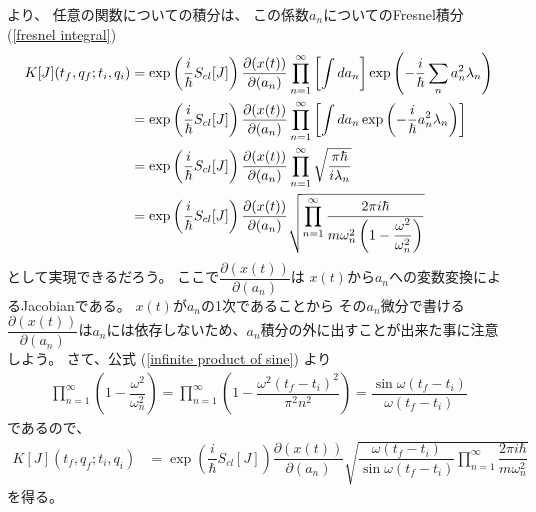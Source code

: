 より、
任意の関数についての積分は、
この係数$a_n$についてのFresnel積分
(\ref{fresnel integral})
\begin{align}
    K[J]( t_f, q_f ; t_i, q_i )
    &=
    \exp\left(
        \dfrac{i}{\hbar} S_{cl} [J]
    \right)
        \dfrac{ \partial ( x(t) ) }
            { \partial (a_n) }
    \prod_{n=1}^\infty
    \left[
        \int d a_n
    \right]
    \exp\left(
        -
        \dfrac{ i }{\hbar}
        \sum_{n}
        a_n^2
        \lambda_n
    \right)
\notag\\&=
    \exp\left(
        \dfrac{i}{\hbar} S_{cl} [J]
    \right)
        \dfrac{ \partial ( x(t) ) }
            { \partial (a_n) }
    \prod_{n=1}^\infty
    \left[
        \int d a_n
        \exp\left(
            -
            \dfrac{ i }{\hbar}
            a_n^2
            \lambda_n
        \right)
    \right]
\notag\\&=
    \exp\left(
        \dfrac{i}{\hbar} S_{cl} [J]
    \right)
        \dfrac{ \partial ( x(t) ) }
            { \partial (a_n) }
    \prod_{n=1}^\infty
    \sqrt{
        \dfrac{\pi \hbar}{i \lambda_n}
    }
\notag\\&=
    \exp\left(
        \dfrac{i}{\hbar} S_{cl} [J]
    \right)
        \dfrac{ \partial ( x(t) ) }
            { \partial (a_n) }
    \sqrt{
        \prod_{n=1}^\infty
        \dfrac{2 \pi i \hbar}{
            m \omega_n^2 \left(
                1 - \dfrac{ \omega^2 }{ \omega_n^2 }
            \right)
        }
    }
\end{align}
として実現できるだろう。
ここで$\dfrac{ \partial ( x(t) ) }{ \partial (a_n) }$は
$x(t)$から$a_n$への変数変換によるJacobianである。
$x(t)$が$a_n$の1次であることから
その$a_n$微分で書ける
$\dfrac{ \partial ( x(t) ) }{ \partial (a_n) }$は$a_n$には依存しないため、$a_n$積分の外に出すことが出来た事に注意しよう。
さて、公式
(\ref{infinite product of sine})
より
\begin{align}
    \prod_{n=1}^\infty
    \left(
        1 - \dfrac{ \omega^2 }{ \omega_n^2 }
    \right)
    =
    \prod_{n=1}^\infty
    \left(
        1
        -
        \dfrac{
            \omega^2 (t_f - t_i)^2
        }{ \pi^2 n^2 }
    \right)
    =
    \dfrac{
        \sin \omega (t_f - t_i)
    }{ \omega (t_f - t_i) }
\end{align}
であるので、
\begin{align}
    K[J]( t_f, q_f ; t_i, q_i )
    &=
    \exp\left(
        \dfrac{i}{\hbar} S_{cl} [J]
    \right)
        \dfrac{ \partial ( x(t) ) }
            { \partial (a_n) }
    \sqrt{
        \dfrac{
            \omega (t_f - t_i)
        }{
            \sin \omega (t_f - t_i)
        }
        \prod_{n=1}^\infty
        \dfrac{
            2 \pi i \hbar
        }{
            m \omega_n^2
        }
    }
\end{align}
を得る。

